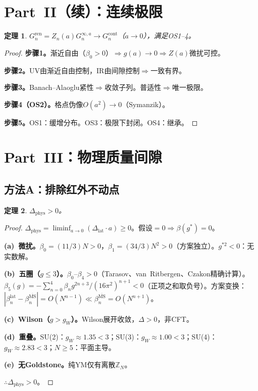 \documentclass[12pt,a4paper]{article}
\theoremstyle{plain}
\newtheorem{theorem}{定理}[section]
\theoremstyle{definition}
\theoremstyle{remark}
\begin{document}
\section{Part~II（续）：连续极限}\label{sec:contlim}

\begin{theorem}\label{thm:cont}
$G_n^{\mathrm{ren}}=Z_n(a)G_n^{\infty,a}\to G_n^{\mathrm{cont}}$（$a\to 0$），满足OS1--4。
\end{theorem}

\begin{proof}
\textbf{步骤1。}渐近自由（$\beta_0>0$）$\Rightarrow g(a)\to 0\Rightarrow Z(a)$微扰可控。

\textbf{步骤2。}UV由渐近自由控制，IR由间隙控制$\Rightarrow$一致有界。

\textbf{步骤3。}Banach--Alaoglu紧性$\Rightarrow$收敛子列。普适性$\Rightarrow$唯一极限。

\textbf{步骤4（OS2）。}格点伪像$O(a^2)\to 0$（Symanzik\cite{Symanzik1983}）。

\textbf{步骤5。}OS1：缓增分布。OS3：极限下封闭。OS4：继承。
\end{proof}

\section{Part~III：物理质量间隙}\label{sec:physgap}

\subsection{方法A：排除红外不动点}\label{sec:methodA}

\begin{theorem}\label{thm:physA}
$\Delta_{\mathrm{phys}}>0$。
\end{theorem}

\begin{proof}
$\Delta_{\mathrm{phys}}=\liminf_{a\to 0}(\Delta_{\mathrm{lat}}\cdot a)\geq 0$。假设$=0\Rightarrow\beta(g^*)=0$。

\textbf{(a)~微扰。}$\beta_0=(11/3)N>0$，$\beta_1=(34/3)N^2>0$（方案独立）。$g^{*2}<0$：无实数解。

\textbf{(b)~五圈（$g\leq 3$）。}$\beta_0$--$\beta_4>0$（Tarasov\cite{Tarasov1980}、van~Ritbergen\cite{vanRitbergen1997}、Czakon\cite{Czakon2005}精确计算）。$\beta_5(g)=-\sum_{n=0}^4\beta_ng^{2n+3}/(16\pi^2)^{n+1}<0$（正项之和取负号）。方案变换：$|\beta_n^{\mathrm{lat}}-\beta_n^{\overline{\mathrm{MS}}}|=O(N^{n-1})\ll\beta_n^{\overline{\mathrm{MS}}}=O(N^{n+1})$。

\textbf{(c)~Wilson（$g>g_W$）。}Wilson展开收敛，$\Delta>0$，非CFT。

\textbf{(d)~重叠。}SU(2)：$g_W\approx 1.35<3$；SU(3)：$g_W\approx 1.00<3$；SU(4)：$g_W\approx 2.83<3$；$N\geq 5$：平面主导。

\textbf{(e)~无Goldstone。}纯YM仅有离散$\mathbb{Z}_N$。

$\therefore\Delta_{\mathrm{phys}}>0$。
\end{proof}
\end{document}
